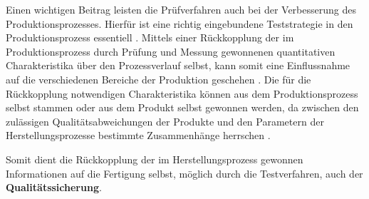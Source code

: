     Einen wichtigen Beitrag leisten die Prüfverfahren auch bei der Verbesserung des Produktionsprozesses.
    Hierfür ist eine richtig eingebundene Teststrategie in den Produktionsprozess essentiell \cite{berger_test-_2012}.
    Mittels einer Rückkopplung der im Produktionsprozess durch Prüfung und Messung gewonnenen quantitativen Charakteristika über den Prozessverlauf selbst, kann somit eine Einflussnahme auf die verschiedenen Bereiche der Produktion geschehen \cite{karger_pruftechnik_1985}.
    Die für die Rückkopplung notwendigen Charakteristika können aus dem Produktionsprozess selbst stammen oder aus dem Produkt selbst gewonnen werden, da zwischen den zulässigen Qualitätsabweichungen der Produkte und den Parametern der Herstellungsprozesse bestimmte Zusammenhänge herrschen \cite{karger_pruftechnik_1985}.

    Somit dient die Rückkopplung der im Herstellungsprozess gewonnen Informationen auf die Fertigung selbst, möglich durch die Testverfahren, auch der \textbf{Qualitätssicherung}.
    
